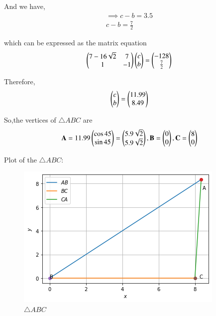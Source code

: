 \documentclass[journal,12pt,twocolumn]{IEEEtran}
\begin{document}
And we have,
\begin{align}
\implies c - b = 3.5
\\
c - b =\frac{7}{2}
\end{align}

which can be expressed as the matrix equation
\begin{align}
\begin{pmatrix}7 - 16\sqrt{2} & 7\\1 & -1\end{pmatrix}\begin{pmatrix}c\\b\end{pmatrix} = \begin{pmatrix}-128 \\ \frac{7}{2}\end{pmatrix}
\end{align}

Therefore,
\begin{align}
\begin{pmatrix}c\\b\end{pmatrix}=\begin{pmatrix}11.99\\8.49\end{pmatrix}
\end{align}

So,the vertices of $\triangle ABC$ are
\begin{align}
\mathbf{A} = 11.99\begin{pmatrix}\cos45\\\sin45\end{pmatrix} = \begin{pmatrix}5.9\sqrt{2}\\5.9\sqrt{2}\end{pmatrix} ,\mathbf{B} = \begin{pmatrix}0\\0\end{pmatrix},\mathbf{C} = \begin{pmatrix}8\\0\end{pmatrix}
\end{align}

Plot of the  $\triangle ABC$:
\begin{figure}[ht]
    \centering
    \includegraphics[width=\columnwidth]{Figure1.png}
    \caption{$\triangle ABC$}
    \label{fig:$\triangle LMN$}
\end{figure}
\end{document}
